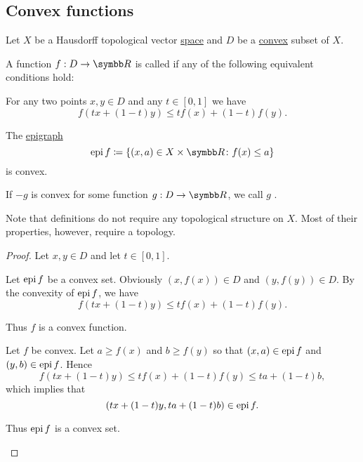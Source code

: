 \subsection{Convex functions}\label{subsec:convex_functions}

Let \( X \) be a Hausdorff topological vector \hyperref[def:topological_vector_space]{space} and \( D \) be a \hyperref[def:convex_set]{convex} subset of \( X \).

\begin{definition}\label{def:convex_functions}
  A function \( f: D \to \BR \) is called  if any of the following equivalent conditions hold:

  \begin{defenum}
     For any two points \( x, y \in D \) and any \( t \in [0, 1] \) we have
    \begin{equation*}
      f(tx + (1-t)y) \leq tf(x) + (1-t)f(y).
    \end{equation*}

     The \hyperref[def:epigraph]{epigraph}
    \begin{equation*}
      \Epi f \coloneqq \{ (x, a) \in X \times \BR \colon f(x) \leq a \}
    \end{equation*}
    is convex.
  \end{defenum}

  If \( -g \) is convex for some function \( g: D \to \BR \), we call \( g \) .

  Note that definitions do not require any topological structure on \( X \). Most of their properties, however, require a topology.
\end{definition}
\begin{proof}
  Let \( x, y \in D \) and let \( t \in [0, 1] \).

  \begin{description}
     Let \( \operatorname{epi} f \) be a convex set. Obviously \( (x, f(x)) \in D \) and \( (y, f(y)) \in D \). By the convexity of \( \operatorname{epi} f \), we have
    \begin{equation*}
      f(tx + (1-t)y) \leq tf(x) + (1-t)f(y).
    \end{equation*}

    Thus \( f \) is a convex function.

     Let \( f \) be convex. Let \( a \geq f(x) \) and \( b \geq f(y) \) so that \( (x, a) \in \operatorname{epi} f \) and \( (y, b) \in \operatorname{epi} f \). Hence
    \begin{equation*}
      f(tx + (1-t)y) \leq tf(x) + (1-t)f(y) \leq ta + (1-t)b,
    \end{equation*}
    which implies that
    \begin{equation*}
      (tx + (1-t)y, ta + (1-t)b) \in \operatorname{epi} f.
    \end{equation*}

    Thus \( \operatorname{epi} f \) is a convex set.
  \end{description}
\end{proof}

